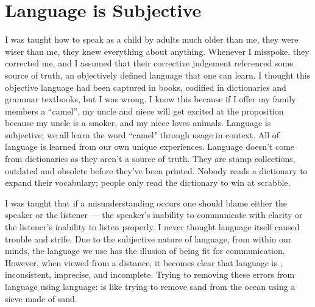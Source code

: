 \section{Language is Subjective}

I was taught how to speak as a child by adults much older than me, they were wiser than me, they knew everything about anything. Whenever I misspoke, they corrected me, and I assumed that their corrective judgement referenced some source of truth, an objectively defined language that one can learn. I thought this objective language had been captured in books, codified in dictionaries and grammar textbooks, but I was wrong. I know this because if I offer my family members a ``camel'', my uncle and niece will get excited at the proposition because my uncle is a smoker, and my niece loves animals. Language is subjective; we all learn the word ``camel" through usage in context. All of language is learned from our own unique experiences. Language doesn't come from dictionaries as they aren't a source of truth. They are stamp collections, outdated and obsolete before they've been printed. Nobody reads a dictionary to expand their vocabulary; people only read the dictionary to win at scrabble.









I was taught that if a misunderstanding occurs one should blame either the speaker or the listener — the speaker's inability to communicate with clarity or the listener's inability to listen properly. I never thought language itself caused trouble and strife. Due to the subjective nature of language, from within our minds, the language we use has the illusion of being fit for communication. However, when viewed from a distance, it becomes clear that language is , inconsistent, imprecise, and incomplete. Trying to removing these errors from language using language: is like trying to remove sand from the ocean using a sieve made of sand. 

